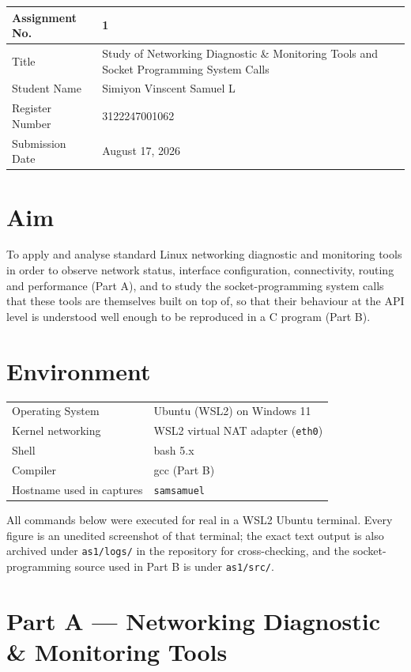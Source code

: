 \documentclass[11pt,a4paper]{article}
\begin{document}
\begin{tabular}{|p{4cm}|p{11cm}|}
\hline
Assignment No. & 1 \\ \hline
Title & Study of Networking Diagnostic \& Monitoring Tools and Socket Programming System Calls\footnotemark \\ \hline
Student Name & Simiyon Vinscent Samuel L \\ \hline
Register Number & 3122247001062 \\ \hline
Submission Date & August 17, 2026 \\ \hline
\end{tabular}

\section{Aim}
To apply and analyse standard Linux networking diagnostic and monitoring tools in order to
observe network status, interface configuration, connectivity, routing and performance
(Part A), and to study the socket-programming system calls that these tools are themselves
built on top of, so that their behaviour at the API level is understood well enough to be
reproduced in a C program (Part B).

\section{Environment}
\begin{tabular}{ll}
\toprule
Operating System & Ubuntu (WSL2) on Windows 11 \\
Kernel networking & WSL2 virtual NAT adapter (\texttt{eth0}) \\
Shell & bash 5.x \\
Compiler & gcc (Part B) \\
Hostname used in captures & \texttt{samsamuel} \\
\bottomrule
\end{tabular}

All commands below were executed for real in a WSL2 Ubuntu terminal. Every figure is an
unedited screenshot of that terminal; the exact text output is also archived under
\texttt{as1/logs/} in the repository for cross-checking, and the socket-programming source
used in Part B is under \texttt{as1/src/}.

\clearpage
\section{Part A --- Networking Diagnostic \& Monitoring Tools}
\end{document}
